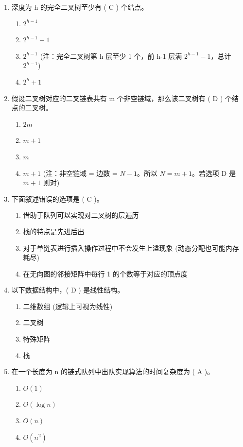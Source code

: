 \documentclass[12pt, a4paper]{article}
\begin{document}
\begin{enumerate}[label=\arabic*.]
    \item 深度为 h 的完全二叉树至少有 ( C ) 个结点。
    \begin{enumerate}
        \item $2^{h-1}$
        \item $2^{h-1}-1$
        \item $2^{h-1}$ (注：完全二叉树第 h 层至少 1 个，前 h-1 层满 $2^{h-1}-1$，总计 $2^{h-1}$)
        \item $2^h+1$
    \end{enumerate}

    \item 假设二叉树对应的二叉链表共有 m 个非空链域，那么该二叉树有 ( D ) 个结点的二叉树。
    \begin{enumerate}
        \item $2m$
        \item $m+1$
        \item $m$
        \item $m+1$ (注：非空链域 = 边数 = $N-1$。所以 $N = m+1$。若选项 D 是 $m+1$ 则对)
    \end{enumerate}

    \item 下面叙述错误的选项是 ( C )。
    \begin{enumerate}
        \item 借助于队列可以实现对二叉树的层遍历
        \item 栈的特点是先进后出
        \item 对于单链表进行插入操作过程中不会发生上溢现象 (动态分配也可能内存耗尽)
        \item 在无向图的邻接矩阵中每行 1 的个数等于对应的顶点度
    \end{enumerate}

    \item 以下数据结构中，( D ) 是线性结构。
    \begin{enumerate}
        \item 二维数组 (逻辑上可视为线性)
        \item 二叉树
        \item 特殊矩阵
        \item 栈
    \end{enumerate}

    \item 在一个长度为 n 的链式队列中出队实现算法的时间复杂度为 ( A )。
    \begin{enumerate}
        \item $O(1)$
        \item $O(\log n)$
        \item $O(n)$
        \item $O(n^2)$
    \end{enumerate}


\end{enumerate}
\end{document}
